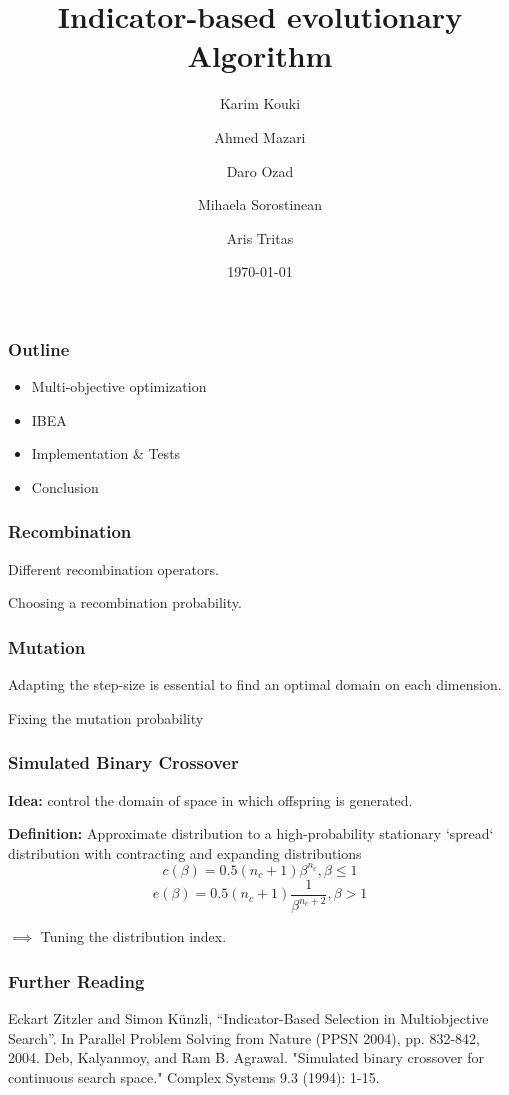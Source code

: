 \documentclass[12pt]{beamer}
\title{Indicator-based evolutionary Algorithm}
\author{Karim Kouki \and Ahmed Mazari \and Daro Ozad \and Mihaela Sorostinean \and Aris Tritas}
\institute{
	M.Sc. Machine Learning, Information and Content - 
	University of Paris-Saclay
}
\date{\today}
\newcommand{\bi}{\begin{itemize}}
\newcommand{\ei}{\end{itemize}}
\begin{document}
  \begin{frame}
  	\titlepage
  \end{frame}
  
  \begin{frame}
    \frametitle{Outline}
    \bi
    \item Multi-objective optimization
    \item IBEA
    \item Implementation \& Tests
    \item Conclusion
    \ei
    
  \end{frame}
  
    \begin{frame}
    \frametitle{Recombination}
    
    Different recombination operators.
    
    Choosing a recombination probability.
    
  \end{frame}
  
    \begin{frame}
    \frametitle{Mutation}
    Adapting the step-size is essential to find an optimal domain on each dimension.
    
    Fixing the mutation probability
  \end{frame}

  \begin{frame}
    \frametitle{Simulated Binary Crossover}
    \textbf{Idea:} control the domain of space in which offspring is generated.
    
    \textbf{Definition:} Approximate distribution to a high-probability stationary `spread` distribution with contracting and expanding distributions
    $$ c(\beta) = 0.5(n_c +1)\beta^{n_c}, \beta \leq 1$$
        $$ e(\beta) = 0.5(n_c +1)\frac{1}{\beta^{n_c+2}}, \beta > 1$$
        
    $\implies$ Tuning the distribution index.
  \end{frame}
  
  \begin{frame}
  \end{frame}
  
    
  
\begin{frame}[allowframebreaks]
  \frametitle<presentation>{Further Reading}    
\begin{thebibliography}{}
\beamertemplatearticlebibitems
{} Eckart Zitzler and Simon Künzli, “Indicator-Based Selection in Multiobjective Search”. In Parallel Problem Solving from Nature (PPSN 2004), pp. 832-842, 2004.
 Deb, Kalyanmoy, and Ram B. Agrawal. "Simulated binary crossover for continuous search space." Complex Systems 9.3 (1994): 1-15.
\end{thebibliography}
\end{frame}
\end{document}
